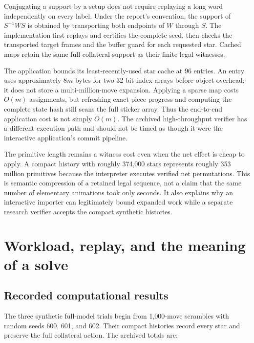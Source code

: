 \documentclass[a4paper,11pt]{article}
\begin{document}
Conjugating a support by a setup does not require replaying a long word independently on every label. Under the report's convention, the support of \(S^{-1}WS\) is obtained by transporting both endpoints of \(W\) through \(S\). The implementation first replays and certifies the complete seed, then checks the transported target frames and the buffer guard for each requested star. Cached maps retain the same full collateral support as their finite legal witnesses.

The application bounds its least-recently-used star cache at 96 entries. An entry uses approximately \(8m\) bytes for two 32-bit index arrays before object overhead; it does not store a multi-million-move expansion. Applying a sparse map costs \(O(m)\) assignments, but refreshing exact piece progress and computing the complete state hash still scans the full sticker array. Thus the end-to-end application cost is not simply \(O(m)\). The archived high-throughput verifier has a different execution path and should not be timed as though it were the interactive application's commit pipeline.

The primitive length remains a witness cost even when the net effect is cheap to apply. A compact history with roughly 374,000 stars represents roughly 353 million primitives because the interpreter executes verified net permutations. This is semantic compression of a retained legal sequence, not a claim that the same number of elementary animations took only seconds. It also explains why an interactive importer can legitimately bound expanded work while a separate research verifier accepts the compact synthetic histories.


\section{Workload, replay, and the meaning of a solve}
\label{sec:6}

\subsection{Recorded computational results}

The three synthetic full-model trials begin from 1,000-move scrambles with random seeds 600, 601, and 602. Their compact histories record every star and preserve the full collateral action. The archived totals are:
\end{document}
